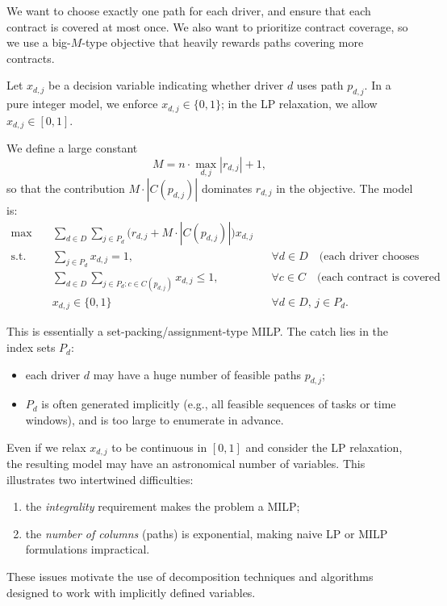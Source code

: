 \documentclass[11pt]{article}
\begin{document}
We want to choose exactly one path for each driver, and ensure that each contract
is covered at most once.
We also want to prioritize contract coverage, so we use a big-$M$-type objective
that heavily rewards paths covering more contracts.

Let $x_{d,j}$ be a decision variable indicating whether driver $d$ uses path
$p_{d,j}$.
In a pure integer model, we enforce $x_{d,j} \in \{0,1\}$; in the LP relaxation,
we allow $x_{d,j} \in [0,1]$.

We define a large constant
\[
    M = n \cdot \max_{d,j} |r_{d,j}| + 1,
\]
so that the contribution $M \cdot |C(p_{d,j})|$ dominates $r_{d,j}$ in the
objective.
The model is:
\begin{align*}
    \max \quad &
    \sum_{d \in D} \sum_{j \in P_d}
    \bigl( r_{d,j} + M \cdot |C(p_{d,j})| \bigr) x_{d,j} \\
    \text{s.t.} \quad
    & \sum_{j \in P_d} x_{d,j} = 1, \quad && \forall d \in D \quad
      \text{(each driver chooses exactly one path)} \\
    & \sum_{d \in D} \sum_{j \in P_d : c \in C(p_{d,j})} x_{d,j} \le 1,
      && \forall c \in C \quad
      \text{(each contract is covered at most once)} \\
    & x_{d,j} \in \{0,1\} \quad && \forall d \in D,\, j \in P_d.
\end{align*}

This is essentially a set-packing/assignment-type MILP.
The catch lies in the index sets $P_d$:
\begin{itemize}
    \item each driver $d$ may have a huge number of feasible paths $p_{d,j}$;
    \item $P_d$ is often generated implicitly (e.g., all feasible sequences of
          tasks or time windows), and is too large to enumerate in advance.
\end{itemize}
Even if we relax $x_{d,j}$ to be continuous in $[0,1]$ and consider the LP
relaxation, the resulting model may have an astronomical number of variables.
This illustrates two intertwined difficulties:
\begin{enumerate}
    \item the \emph{integrality} requirement makes the problem a MILP;
    \item the \emph{number of columns} (paths) is exponential, making naive LP
          or MILP formulations impractical.
\end{enumerate}

These issues motivate the use of decomposition techniques and algorithms
designed to work with implicitly defined variables.
\end{document}
